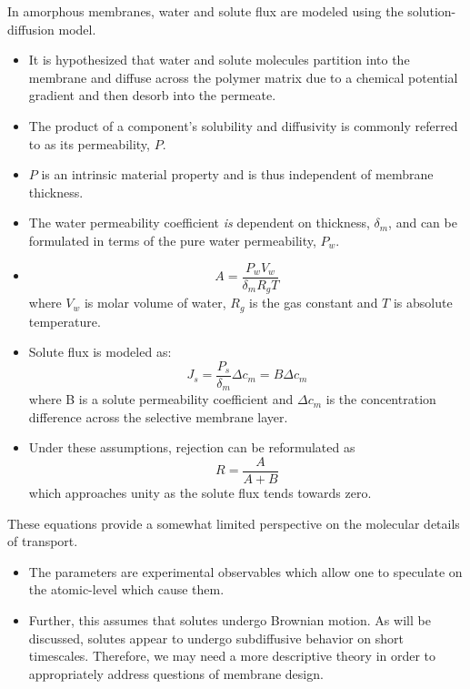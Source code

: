   In amorphous membranes, water and solute flux are modeled using the solution-diffusion 
  model.
  \begin{itemize}
    \item It is hypothesized that water and solute molecules partition into the
    membrane and diffuse across the polymer matrix due to a chemical potential
    gradient and then desorb into the permeate.
    \item The product of a component's solubility and diffusivity is commonly
    referred to as its permeability, $P$.~\cite{wijmans_solution-diffusion_1995}
    \item $P$ is an intrinsic material property and is thus independent of membrane
    thickness.  %
    \item The water permeability coefficient \textit{is} dependent on thickness, $\delta_m$,
    and can be formulated in terms of the pure water permeability, $P_w$.
    \item \begin{equation}
    A = \frac{P_wV_w}{\delta_mR_gT}
    \end{equation}
    where $V_w$ is molar volume of water, $R_g$ is the gas constant and $T$ is
    absolute temperature.
    \item Solute flux is modeled as:
    \begin{equation}
    J_s = \frac{P_s}{\delta_m}\Delta c_m = B\Delta c_m
    \end{equation}
    where B is a solute permeability coefficient and $\Delta c_m$ is the concentration
    difference across the selective membrane layer.
    \item Under these assumptions, rejection can be reformulated as
    \begin{equation}
    R = \frac{A}{A + B}
    \end{equation}
    which approaches unity as the solute flux tends towards zero.
  \end{itemize}  
  
  These equations provide a somewhat limited perspective on the molecular details
  of transport.
  \begin{itemize}
    \item The parameters are experimental observables which allow one to 
    speculate on the atomic-level which cause them.
    \item Further, this assumes that solutes undergo Brownian motion. As will
    be discussed, solutes appear to undergo subdiffusive behavior on short
    timescales. Therefore, we may need a more descriptive theory in order
    to appropriately address questions of membrane design.
  \end{itemize}
  
